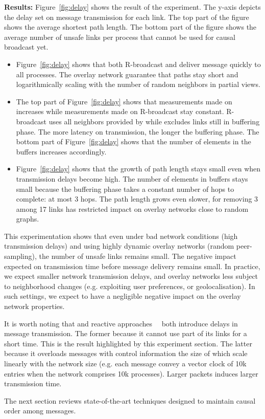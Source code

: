 \noindent \textbf{Results:} Figure~\ref{fig:delay} shows the result of the
experiment. The y-axis depicts the delay set on message transmission for each
link. The top part of the figure shows the average shortest path length. The
bottom part of the figure shows the average number of unsafe links per process
that cannot be used for causal broadcast yet.
\begin{itemize}[leftmargin=*]
\item Figure~\ref{fig:delay} shows that both R-broadcast and \CBROADCAST deliver
  message quickly to all processes. The overlay network guarantee that paths
  stay short and logarithmically scaling with the number of random neighbors in
  partial views.
\item The top part of Figure~\ref{fig:delay} shows that measurements made on
  \CBROADCAST increases while measurements made on R-broadcast stay
  constant. R-broadcast uses all neighbors provided by \SPRAY while \CBROADCAST
  excludes links still in buffering phase. The more latency on transmission, the
  longer the buffering phase. The bottom part of Figure~\ref{fig:delay} shows
  that the number of elements in the buffers increases accordingly.
\item Figure~\ref{fig:delay} shows that the growth of path length stays small
  even when transmission delays become high. The number of elements in buffers
  stays small because the buffering phase takes a constant number of hops to
  complete: at most 3 hops. The path length grows even slower, for removing 3
  among 17 links has restricted impact on overlay networks close to random
  graphs.
\end{itemize}

This experimentation shows that even under bad network conditions (high
transmission delays) and using highly dynamic overlay networks (random
peer-sampling), the number of unsafe links remains small. The negative impact
expected on transmission time before message delivery remains small. In
practice, we expect smaller network transmission delays, and overlay networks
less subject to neighborhood changes (e.g. exploiting user preferences, or
geolocalisation). In such settings, we expect \CBROADCAST to have a negligible
negative impact on the overlay network properties.

It is worth noting that \CBROADCAST and reactive
approaches~\cite{almeida2008interval,fidge1988timestamps,mattern1989virtual,singhal1992efficient}~\cite{birman1987reliable,hadzilacos1993fault,mostefaoui2017probabilistic}
both introduce delays in message transmission. The former because it cannot use
part of its links for a short time. This is the result highlighted by this
experiment section.  The latter because it overloads messages with control
information the size of which scale linearly with the network size (e.g. each
message convey a vector clock of 10k entries when the network comprises 10k
processes).  Larger packets induces larger transmission time.

The next section reviews state-of-the-art techniques designed to maintain causal
order among messages.

